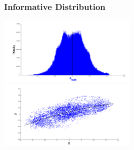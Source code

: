 \documentclass[graphics]{beamer}
\begin{document}
\begin{frame}
   \frametitle{Informative Distribution}
   \vspace{37pt}
       \includegraphics[width=0.5\textwidth, height=.55\textwidth]{hist_r_exp1_truth_black} %
   \includegraphics[width=0.5\textwidth, height=.55\textwidth]{stoch_cloud_finalcurve} %
\end{frame}
\end{document}
